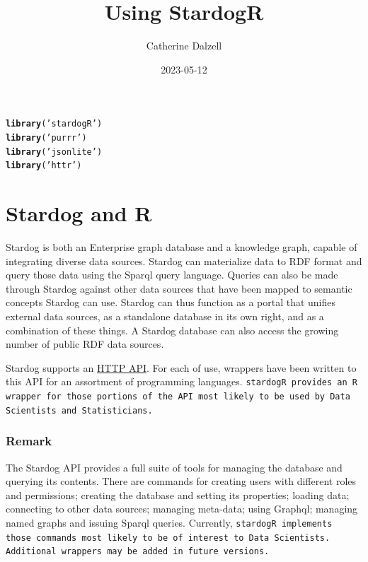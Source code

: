 \documentclass{article}\usepackage[]{graphicx}\usepackage[]{xcolor}
\title{Using StardogR}
\author{Catherine Dalzell}
\date{2023-05-12}
\makeatletter
\newcommand{\hlstr}[1]{\textcolor[rgb]{0.192,0.494,0.8}{#1}}%
\newcommand{\hlstd}[1]{\textcolor[rgb]{0.345,0.345,0.345}{#1}}%
\newcommand{\hlkwd}[1]{\textcolor[rgb]{0.737,0.353,0.396}{\textbf{#1}}}%
\newenvironment{kframe}{%
 \def\at@end@of@kframe{}%
 \ifinner\ifhmode%
  \def\at@end@of@kframe{\end{minipage}}%
  \begin{minipage}{\columnwidth}%
 \fi\fi%
 \def\FrameCommand##1{\hskip\@totalleftmargin \hskip-\fboxsep
 \colorbox{shadecolor}{##1}\hskip-\fboxsep
     \hskip-\linewidth \hskip-\@totalleftmargin \hskip\columnwidth}%
 \MakeFramed {\advance\hsize-\width
   \@totalleftmargin\z@ \linewidth\hsize
   \@setminipage}}%
 {\par\unskip\endMakeFramed%
 \at@end@of@kframe}
\newenvironment{knitrout}{}{} %
\makeatother
\begin{document}
\maketitle

\tableofcontents




\begin{knitrout}
\color{fgcolor}\begin{kframe}
\begin{alltt}
\hlkwd{library}\hlstd{(}\hlstr{'stardogR'}\hlstd{)}
\hlkwd{library}\hlstd{(}\hlstr{'purrr'}\hlstd{)}
\hlkwd{library}\hlstd{(}\hlstr{'jsonlite'}\hlstd{)}
\hlkwd{library}\hlstd{(}\hlstr{'httr'}\hlstd{)}
\end{alltt}
\end{kframe}
\end{knitrout}


\section{Stardog and R}

Stardog is both an Enterprise graph database and a knowledge graph, capable of integrating diverse data sources. Stardog can materialize data to RDF format and query those data using the Sparql query language. Queries can also be made through Stardog against other data sources that have been mapped to semantic concepts Stardog can use. Stardog can thus function as a portal that unifies external data sources, as a standalone database in its own right, and as a combination of these things. A Stardog database can also access the growing number of public RDF data sources.

Stardog supports an \href{https://stardog-union.github.io/http-docs/}{HTTP API}. For each of use, wrappers have been written to this API for an assortment of programming languages. \tt{stardogR} provides an R wrapper for those portions of the API most likely to be used by Data Scientists and Statisticians.

\subsubsection*{Remark}
The Stardog API provides a full suite of tools for managing the database and querying its contents. There are commands for creating users with different roles and permissions; creating the database and setting its properties; loading data; connecting to other data sources; managing meta-data; using Graphql; managing named graphs and issuing Sparql queries. Currently, \tt{stardogR} implements those commands most likely to be of interest to Data Scientists. Additional wrappers may be added in future versions.
\end{document}
